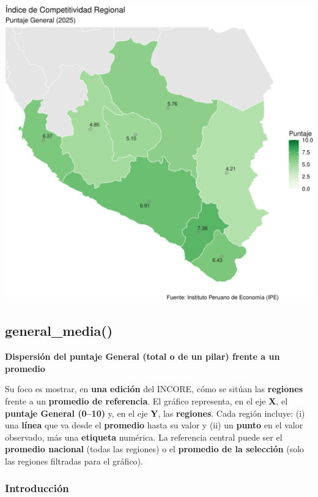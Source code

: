 \documentclass[
  11pt,
  letterpaper,
  DIV=11,
  numbers=noendperiod]{scrartcl}
\begin{document}
\includegraphics{Manual_files/figure-pdf/unnamed-chunk-46-1.pdf}

\subsection{\texorpdfstring{\textbf{general\_media()}}{general\_media()}}\label{general_media}

\textbf{Dispersión del puntaje General (total o de un pilar) frente a un
promedio}

Su foco es mostrar, en \textbf{una edición} del INCORE, cómo se sitúan
las \textbf{regiones} frente a un \textbf{promedio de referencia}. El
gráfico representa, en el eje \textbf{X}, el \textbf{puntaje General
(0--10)} y, en el eje \textbf{Y}, las \textbf{regiones}. Cada región
incluye: (i) una \textbf{línea} que va desde el \textbf{promedio} hasta
su valor y (ii) un \textbf{punto} en el valor observado, más una
\textbf{etiqueta} numérica. La referencia central puede ser el
\textbf{promedio nacional} (todas las regiones) o el \textbf{promedio de
la selección} (solo las regiones filtradas para el gráfico).

\subsubsection{\texorpdfstring{\textbf{Introducción}}{Introducción}}\label{introducciuxf3n-8}
\end{document}
